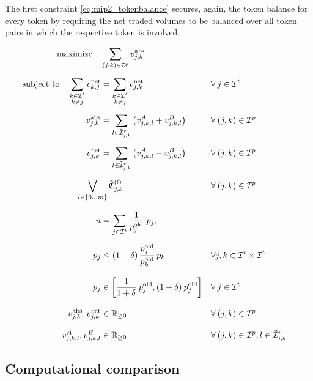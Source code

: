 \documentclass[11pt,parskip=full]{scrartcl}%
\newcommand*{\itokens}{\mathcal{I}^t}       %
\newcommand*{\itokenpairs}{\mathcal{I}^p}   %
\begin{document}
The first constraint \eqref{eq:mip2_tokenbalance} secures, again, the token balance for every token
by requiring the net traded volumes to be balanced over all token pairs in which the respective
token is involved.

\newpage
\begin{subequations}
\begin{align}
  \text{maximize} \quad & \sum\limits_{(j,k) \in \itokenpairs} v_{j,k}^\mathrm{abs}
  \label{eq:mip2_objective}
  \\[2mm]
  \text{subject to} \quad
  \sum_{\substack{k \in \itokens \\ k \neq j}} v_{k,j}^\mathrm{net}
  &= \sum_{\substack{k \in \itokens \\ k \neq j}} v_{j,k}^\mathrm{net}
  && \forall \> j \in \itokens
  \label{eq:mip2_tokenbalance}
  \\[2mm]
  v_{j,k}^\mathrm{abs}
  &= \sum\limits_{l \in \tilde{\mathcal{I}}_{j,k}^r} \left( v^A_{j,k,l} + v^B_{j,k,l} \right)
  && \forall \> (j,k) \in \itokenpairs
  \label{eq:mip2_volume_aggr_abs}
  \\[2mm]
  v_{j,k}^\mathrm{net}
  &= \sum\limits_{l \in \tilde{\mathcal{I}}_{j,k}^r} \left( v^A_{j,k,l} - v^B_{j,k,l} \right)
  && \forall \> (j,k) \in \itokenpairs
  \label{eq:mip2_volume_aggr_net}
  \\[2mm]
  &\hspace{-1cm}\bigvee\limits_{l \in \{0 \ldots m\}} \tilde{\mathfrak{C}}^{(l)}_{j,k}
  && \forall \> (j,k) \in \itokenpairs
  \\[3mm]
  n
  &= \sum\limits_{j \in \itokens} \frac{1}{p^\mathrm{old}_j} \> p_j,
  \label{eq:mip2_reftoken}
  \\[2mm]
  p_j
  &\le \left(1+\delta\right) \frac{p^\mathrm{old}_j}{p^\mathrm{old}_k} \, p_k
  && \forall j,k \in \itokens \times \itokens
  \label{eq:mip2_maxfluct}
  \\[3mm]
  p_j
  &\in \left[ \frac{1}{1+\delta} \> p^\mathrm{old}_j, (1+\delta) \> p^\mathrm{old}_j \right]
  && \forall \> j \in \itokens
  \\[3mm]
  v_{j,k}^\mathrm{abs}, v_{j,k}^\mathrm{net}
  &\in \mathbb{R}_{\ge 0}
  && \forall \> (j,k) \in \itokenpairs
  \\[3mm]
  v^A_{j,k,l}, v^B_{j,k,l}
  &\in \mathbb{R}_{\ge 0}
  && \forall \> (j,k) \in \itokenpairs, l \in \tilde{\mathcal{I}}_{j,k}^r
\end{align}
\label{eq:mip2}
\end{subequations}


\newpage
\subsection{Computational comparison}
\label{subsec:computational_comparison}
\end{document}
